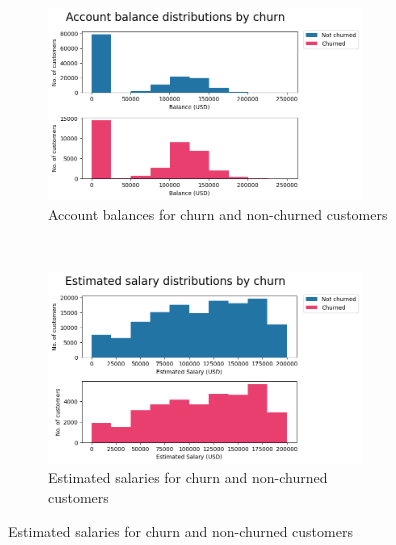 \documentclass[]{article}
\begin{document}
\begin{figure}[t!]
	\centering
	\begin{subfigure}[t]{0.55\textwidth}
		\centering
		\includegraphics[height=2in]{account_balance_by_churn}
		\caption{Account balances for churn and non-churned customers}
	\end{subfigure}%
	~ 
	\begin{subfigure}[t]{0.5\textwidth}
		\centering
		\includegraphics[height=2in]{estimated_salary_by_churn}
		\caption{Estimated salaries for churn and non-churned customers}
	\end{subfigure}
	

\end{figure}
\end{document}
